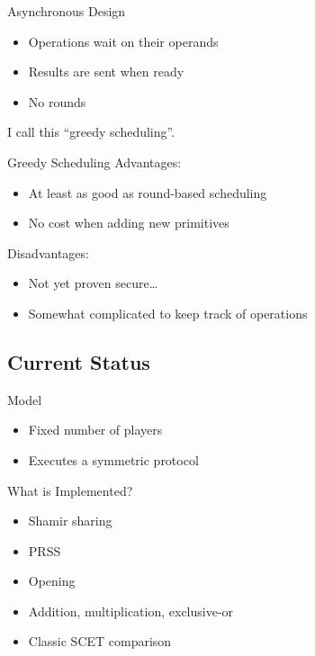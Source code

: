 \documentclass[t,noamsthm]{beamer}
\begin{document}
\begin{frame}{Asynchronous Design}
  \begin{itemize}
  \item Operations wait on their operands
  \item Results are sent when ready
  \item No rounds
  \end{itemize}
  I call this ``greedy scheduling''.
\end{frame}

\begin{frame}{Greedy Scheduling}
  Advantages:
  \begin{itemize}
  \item At least as good as round-based scheduling
  \item No cost when adding new primitives
  \end{itemize}

  Disadvantages:
  \begin{itemize}
  \item Not yet proven secure\dots
  \item Somewhat complicated to keep track of operations
  \end{itemize}
\end{frame}


\subsection{Current Status}

\begin{frame}{Model}
  \begin{itemize}
  \item Fixed number of players
  \item Executes a symmetric protocol
  \end{itemize}
\end{frame}

\begin{frame}{What is Implemented?}
  \begin{itemize}
  \item Shamir sharing
  \item PRSS
  \item Opening
  \item Addition, multiplication, exclusive-or
  \item Classic SCET comparison
  \end{itemize}
\end{frame}
\end{document}

